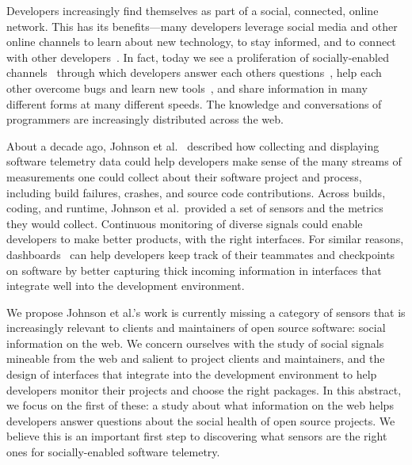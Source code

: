 Developers increasingly find themselves as part of a social, connected, online network.
This has its benefits---many developers leverage social media and other online channels to learn about new technology, to stay informed, and to connect with other developers~\cite{singer_software_2014,storey_how_2016}.
In fact, today we see a proliferation of socially-enabled channels~\cite{storey_revolution_2014} through which developers answer each others questions~\cite{mamykina_fastest_2011}, help each other overcome bugs and learn new tools~\cite{parnin_blogging_2013}, and share information in many different forms at many different speeds.
The knowledge and conversations of programmers are increasingly distributed across the web.

About a decade ago, Johnson et al.~\cite{johnson_improving_2005} described how collecting and displaying software telemetry data could help developers make sense of the many streams of measurements one could collect about their software project and process, including build failures, crashes, and source code contributions.
Across builds, coding, and runtime, Johnson et al.\ provided a set of sensors and the metrics they would collect.
Continuous monitoring of diverse signals could enable developers to make better products, with the right interfaces.
For similar reasons, dashboards~\cite{treude_awareness_2010} can help developers keep track of their teammates and checkpoints on software by better capturing thick incoming information in interfaces that integrate well into the development environment.

We propose Johnson et al.'s work is currently missing a category of sensors that is increasingly relevant to clients and maintainers of open source software:
social information on the web.
We concern ourselves with the study of social signals mineable from the web and salient to project clients and maintainers, and the design of interfaces that integrate into the development environment to help developers monitor their projects and choose the right packages.
In this abstract, we focus on the first of these:
a study about what information on the web helps developers answer questions about the social health of open source projects.
We believe this is an important first step to discovering what sensors are the right ones for socially-enabled software telemetry.

